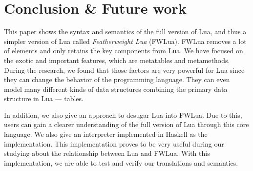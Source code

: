\chapter{Conclusion \& Future work}\label{chp: conclusion}
This paper shows the syntax and semantics of the full version of Lua, and thus a simpler version of Lua called \emph{Featherweight Lua} (FWLua). FWLua removes a lot of elements and only retains the key components from Lua. We have focused on the exotic and important features, which are metatables and metamethods. During the research, we found that those factors are very powerful for Lua since they can change the behavior of the programming language. They can even model many different kinds of data structures combining the primary data structure in Lua --- tables.

In addition, we also give an approach to desugar Lua into FWLua. Due to this, users can gain a clearer understanding of the full version of Lua through this core language. We also give an interpreter implemented in Haskell as the implementation. This implementation proves to be very useful during our studying about the relationship between Lua and FWLua. With this implementation, we are able to test and verify our translations and semantics.